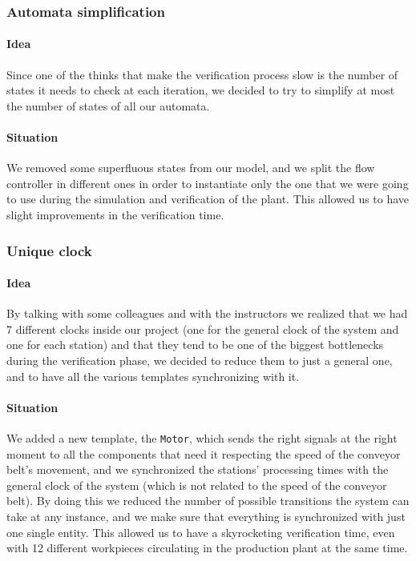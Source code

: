 \documentclass[a4paper]{article}
\begin{document}
    \subsubsection{Automata simplification}

    \paragraph{Idea} Since one of the thinks that make the verification process slow is the number of states it needs to check at each iteration, we decided to try to simplify at most the number of states of all our automata.

    \paragraph{Situation} We removed some superfluous states from our model, and we split the flow controller in different ones in order to instantiate only the one that we were going to use during the simulation and verification of the plant. This allowed us to have slight improvements in the verification time.

    \subsubsection{Unique clock}

    \paragraph{Idea} By talking with some colleagues and with the instructors we realized that we had 7 different clocks inside our project (one for the general clock of the system and one for each station) and that they tend to be one of the biggest bottlenecks during the verification phase, we decided to reduce them to just a general one, and to have all the various templates synchronizing with it.

    \paragraph{Situation} We added a new template, the \texttt{Motor}, which sends the right signals at the right moment to all the components that need it respecting the speed of the conveyor belt's movement, and we synchronized the stations' processing times with the general clock of the system (which is not related to the speed of the conveyor belt). By doing this we reduced the number of possible transitions the system can take at any instance, and we make sure that everything is synchronized with just one single entity. This allowed us to have a skyrocketing verification time, even with 12 different workpieces circulating in the production plant at the same time.
\end{document}
